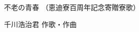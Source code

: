 \documentclass[10pt,b5j]{tarticle} %
\begin{document}
\begin{minipage}[c]{0.7\hsize} %
    \begin{center}
        {\LARGE
            不老の青春 %
        }
        {\small 
            （恵迪寮百周年記念寄贈寮歌） %
        }
    \end{center}
\end{minipage}
\begin{minipage}[c]{0.3\hsize} %
    \begin{flushright} %
        千川浩治君 作歌・作曲 %
    \end{flushright}
\end{minipage}
\end{document}

